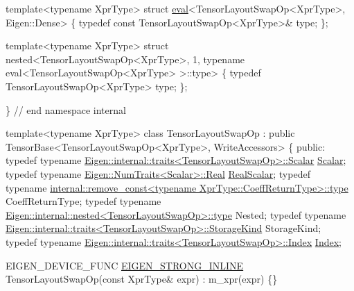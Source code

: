 \begin{DoxyCodeInclude}
\textcolor{keyword}{template}<\textcolor{keyword}{typename} XprType>
\textcolor{keyword}{struct }\hyperlink{eigen_2test_2sparse__permutations_8cpp_ad87822100feba90851ac71ba08fce30b}{eval}<TensorLayoutSwapOp<XprType>, Eigen::Dense>
\{
  \textcolor{keyword}{typedef} \textcolor{keyword}{const} TensorLayoutSwapOp<XprType>& type;
\};

\textcolor{keyword}{template}<\textcolor{keyword}{typename} XprType>
\textcolor{keyword}{struct }nested<TensorLayoutSwapOp<XprType>, 1, typename eval<TensorLayoutSwapOp<XprType> >::type>
\{
  \textcolor{keyword}{typedef} TensorLayoutSwapOp<XprType> type;
\};

\}  \textcolor{comment}{// end namespace internal}



\textcolor{keyword}{template}<\textcolor{keyword}{typename} XprType>
\textcolor{keyword}{class }TensorLayoutSwapOp : \textcolor{keyword}{public} TensorBase<TensorLayoutSwapOp<XprType>, WriteAccessors>
\{
  \textcolor{keyword}{public}:
  \textcolor{keyword}{typedef} \textcolor{keyword}{typename} \hyperlink{struct_eigen_1_1internal_1_1traits}{Eigen::internal::traits<TensorLayoutSwapOp>::Scalar}
       \hyperlink{eigen_2bench_2bench__gemm_8cpp_a052eb942d12b6404aade6fae4b075fb9}{Scalar};
  \textcolor{keyword}{typedef} \textcolor{keyword}{typename} \hyperlink{struct_eigen_1_1_generic_num_traits_abca8573812593670795c41f22aa9d5e2}{Eigen::NumTraits<Scalar>::Real} 
      \hyperlink{eigen_2bench_2bench__gemm_8cpp_acb5c3dc237f99cf17167e8a629f01b43}{RealScalar};
  \textcolor{keyword}{typedef} \textcolor{keyword}{typename} 
      \hyperlink{struct_eigen_1_1internal_1_1remove__const_afe3dbb0bdee2ec8eed4416723d75bc90}{internal::remove\_const<typename XprType::CoeffReturnType>::type}
       CoeffReturnType;
  \textcolor{keyword}{typedef} \textcolor{keyword}{typename} \hyperlink{class_eigen_1_1internal_1_1_tensor_lazy_evaluator_writable}{Eigen::internal::nested<TensorLayoutSwapOp>::type}
       Nested;
  \textcolor{keyword}{typedef} \textcolor{keyword}{typename} \hyperlink{struct_eigen_1_1internal_1_1traits}{Eigen::internal::traits<TensorLayoutSwapOp>::StorageKind}
       StorageKind;
  \textcolor{keyword}{typedef} \textcolor{keyword}{typename} \hyperlink{struct_eigen_1_1internal_1_1traits}{Eigen::internal::traits<TensorLayoutSwapOp>::Index}
       \hyperlink{namespace_eigen_a62e77e0933482dafde8fe197d9a2cfde}{Index};

  EIGEN\_DEVICE\_FUNC \hyperlink{eigen_2_eigen_2src_2_core_2util_2_macros_8h_af2b60117c00a6e75812de43bfe7db3b1}{EIGEN\_STRONG\_INLINE} TensorLayoutSwapOp(\textcolor{keyword}{const} XprType& expr)
      : m\_xpr(expr) \{\}


\end{DoxyCodeInclude}
